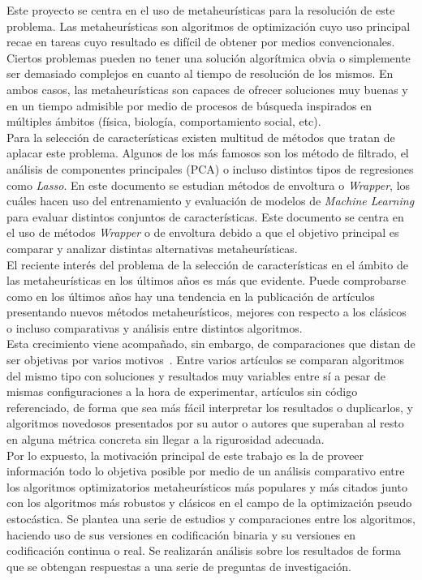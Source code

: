 Este proyecto se centra en el uso de metaheurísticas para la resolución de este problema. Las metaheurísticas son algoritmos de optimización cuyo uso principal recae en tareas cuyo resultado es difícil de obtener por medios convencionales. Ciertos problemas pueden no tener una solución algorítmica obvia o simplemente ser demasiado complejos en cuanto al tiempo de resolución de los mismos. En ambos casos, las metaheurísticas son capaces de ofrecer soluciones muy buenas y en un tiempo admisible por medio de procesos de búsqueda inspirados en múltiples ámbitos (física, biología, comportamiento social, etc). \\[6pt]
Para la selección de características existen multitud de métodos que tratan de aplacar este problema. Algunos de los más famosos son los método de filtrado, el análisis de componentes principales (PCA) o incluso distintos tipos de regresiones como \textit{Lasso}. En este documento se estudian métodos de envoltura o \textit{Wrapper}, los cuáles hacen uso del entrenamiento y evaluación de modelos de \textit{Machine Learning} para evaluar distintos conjuntos de características. Este documento se centra en el uso de métodos \textit{Wrapper} o de envoltura debido a que el objetivo principal es comparar y analizar distintas alternativas metaheurísticas. \\[6pt]
El reciente interés del problema de la selección de características en el ámbito de las
metaheurísticas en los últimos años es más que evidente. Puede comprobarse como en los
últimos años hay una tendencia en la publicación de artículos presentando nuevos métodos
metaheurísticos, mejores con respecto a los clásicos o incluso comparativas y análisis entre
distintos algoritmos.\\[6pt]

Esta crecimiento viene acompañado, sin embargo, de comparaciones que distan de ser objetivas
por varios motivos~\cite{molina_comprehensive_2020}. Entre varios artículos se comparan algoritmos del mismo tipo con
soluciones y resultados muy variables entre sí a pesar de mismas configuraciones a la hora
de experimentar, artículos sin código referenciado, de forma que sea más fácil interpretar
los resultados o duplicarlos, y algoritmos novedosos presentados por su autor o autores que
superaban al resto en alguna métrica concreta sin llegar a la rigurosidad adecuada.\\[6pt]

Por lo expuesto, la motivación principal de este trabajo es la de proveer información todo lo objetiva posible por medio de un análisis comparativo entre los
algoritmos optimizatorios metaheurísticos más populares y más citados junto con los
algoritmos más robustos y clásicos en el campo de la optimización pseudo estocástica. Se plantea una serie de estudios y comparaciones entre los algoritmos, haciendo uso de sus versiones en codificación binaria y su versiones en codificación continua o real. Se realizarán análisis sobre los resultados de forma que se obtengan respuestas a una serie de preguntas de investigación.

